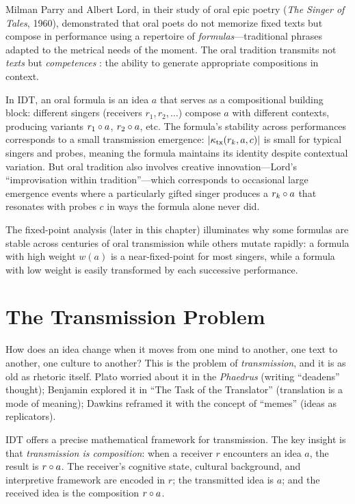 \begin{interpretation}\label{interp:ch7:lord_parry_oral}
Milman Parry and Albert Lord, in their study of oral epic poetry
(\emph{The Singer of Tales}, 1960), demonstrated that oral poets do not
memorize fixed texts but compose in performance using a repertoire of
\emph{formulas}---traditional phrases adapted to the metrical needs of the
moment. The oral tradition transmits not \emph{texts} but \emph{competences}
: the ability to generate appropriate compositions in context.

In IDT, an oral formula is an idea $a$ that serves as a compositional
building block: different singers (receivers $r_1, r_2, \ldots$) compose
$a$ with different contexts, producing variants $r_1 \circ a$,
$r_2 \circ a$, etc. The formula's stability across performances
corresponds to a small transmission emergence: $|\kappa_{\text{tx}}(r_k,
a, c)|$ is small for typical singers and probes, meaning the formula
maintains its identity despite contextual variation. But oral tradition
also involves creative innovation---Lord's ``improvisation within
tradition''---which corresponds to occasional large emergence events
where a particularly gifted singer produces a $r_k \circ a$ that
resonates with probes $c$ in ways the formula alone never did.

The fixed-point analysis (later in this chapter) illuminates why some
formulas are stable across centuries of oral transmission while others
mutate rapidly: a formula with high weight $w(a)$ is a near-fixed-point
for most singers, while a formula with low weight is easily transformed
by each successive performance.
\end{interpretation}

\section{The Transmission Problem}

How does an idea change when it moves from one mind to another, one text to
another, one culture to another? This is the problem of \emph{transmission},
and it is as old as rhetoric itself. Plato worried about it in the
\emph{Phaedrus} (writing ``deadens'' thought); Benjamin explored it in
``The Task of the Translator'' (translation is a mode of meaning);
Dawkins reframed it with the concept of ``memes'' (ideas as replicators).

IDT offers a precise mathematical framework for transmission. The key
insight is that \emph{transmission is composition}: when a receiver $r$
encounters an idea $a$, the result is $r \circ a$. The receiver's
cognitive state, cultural background, and interpretive framework are
encoded in $r$; the transmitted idea is $a$; and the received idea is
the composition $r \circ a$.

